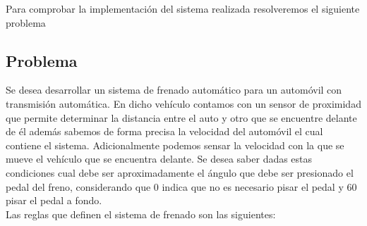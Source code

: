 \documentclass[a4paper,10pt,twocolumn]{article}
\begin{document}
Para comprobar la implementaci\'on del sistema realizada resolveremos el siguiente problema

\subsection*{Problema}

Se desea desarrollar un sistema de frenado autom\'atico para un autom\'ovil con transmisi\'on autom\'atica. En dicho veh\'iculo contamos con un sensor de proximidad que permite determinar la distancia entre el auto y otro que se encuentre delante de \'el adem\'as sabemos de forma precisa la velocidad del autom\'ovil el cual contiene el sistema. Adicionalmente podemos sensar la velocidad con la que se mueve el veh\'iculo que se encuentra delante. Se desea saber dadas estas condiciones cual debe ser aproximadamente el \'angulo que debe ser presionado el pedal del freno, considerando que $0$ indica que no es necesario pisar el pedal y $60$ pisar el pedal a fondo. 
\\

Las reglas que definen el sistema de frenado son las siguientes:
\end{document}
